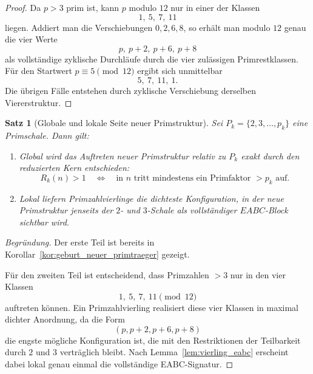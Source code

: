 \documentclass[11pt,a4paper]{article}
\newtheorem{satz}{Satz}
\theoremstyle{definition}
\theoremstyle{remark}
\begin{document}
	\begin{proof}
		Da \(p>3\) prim ist, kann \(p\) modulo \(12\) nur in einer der Klassen
		\[
		1,\ 5,\ 7,\ 11
		\]
		liegen. Addiert man die Verschiebungen \(0,2,6,8\), so erhält man modulo \(12\) genau die
		vier Werte
		\[
		p,\ p+2,\ p+6,\ p+8
		\]
		als vollständige zyklische Durchläufe durch die vier zulässigen Primrestklassen. Für den
		Startwert \(p\equiv 5\pmod{12}\) ergibt sich unmittelbar
		\[
		5,\ 7,\ 11,\ 1.
		\]
		Die übrigen Fälle entstehen durch zyklische Verschiebung derselben Viererstruktur.
	\end{proof}
	
	\begin{satz}[Globale und lokale Seite neuer Primstruktur]
		\label{satz:global_lokal_neu}
		Sei \(P_k=\{2,3,\dots,p_k\}\) eine Primschale. Dann gilt:
		
		\begin{enumerate}
			\item Global wird das Auftreten neuer Primstruktur relativ zu \(P_k\) exakt durch den
			reduzierten Kern entschieden:
			\[
			R_k(n)>1
			\quad\Longleftrightarrow\quad
			\text{in } n \text{ tritt mindestens ein Primfaktor } >p_k \text{ auf.}
			\]
			
			\item Lokal liefern Primzahlvierlinge die dichteste Konfiguration, in der neue
			Primstruktur jenseits der \(2\)- und \(3\)-Schale als vollständiger \(EABC\)-Block
			sichtbar wird.
		\end{enumerate}
	\end{satz}
	
	\begin{proof}[Begründung]
		Der erste Teil ist bereits in Korollar~\ref{kor:geburt_neuer_primtraeger} gezeigt.
		
		Für den zweiten Teil ist entscheidend, dass Primzahlen \(>3\) nur in den vier Klassen
		\[
		1,\ 5,\ 7,\ 11\pmod{12}
		\]
		auftreten können. Ein Primzahlvierling realisiert diese vier Klassen in maximal dichter
		Anordnung, da die Form
		\[
		(p,p+2,p+6,p+8)
		\]
		die engste mögliche Konfiguration ist, die mit den Restriktionen der Teilbarkeit durch
		\(2\) und \(3\) verträglich bleibt. Nach Lemma~\ref{lem:vierling_eabc} erscheint dabei
		lokal genau einmal die vollständige EABC-Signatur.
	\end{proof}
	
\end{document}

